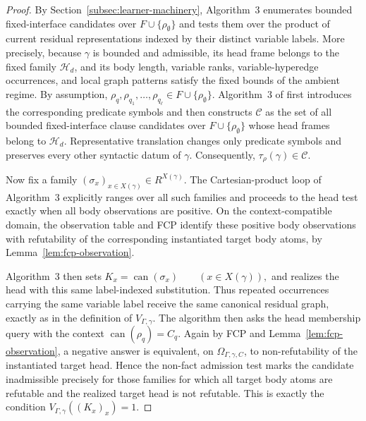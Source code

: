 \documentclass[11pt]{article}
\theoremstyle{definition}
\theoremstyle{remark}
\begin{document}
\begin{proof}
By Section~\ref{subsec:learner-machinery}, Algorithm~3 enumerates bounded
fixed-interface candidates over \(F\cup\{\rho_\emptyset\}\) and tests them
over the product of current residual representations indexed by their distinct
variable labels.  More precisely, because \(\gamma\) is bounded and
admissible, its head frame belongs to the fixed family \(\mathcal H_d\), and
its body length, variable ranks, variable-hyperedge occurrences, and local
graph patterns satisfy the fixed bounds of the ambient regime.  By assumption,
\(\rho_q,\rho_{q_1},\ldots,\rho_{q_\ell} \in F\cup\{\rho_\emptyset\}.\)
Algorithm~3 of \cite{ShoudaiEtAl2026} first introduces the corresponding
predicate symbols and then constructs \(\mathcal C\) as the set of all
bounded fixed-interface clause candidates over
\(F\cup\{\rho_\emptyset\}\) whose head frames belong to \(\mathcal H_d\).
Representative translation changes only predicate symbols and preserves every
other syntactic datum of \(\gamma\).  Consequently,
\(\tau_\rho(\gamma)\in\mathcal C.\)

Now fix a family
\((\sigma_x)_{x\in X(\gamma)}\in R^{X(\gamma)}.\)
The Cartesian-product loop of Algorithm~3 explicitly ranges over all such
families and proceeds to the head test exactly when all body observations are
positive.
On the context-compatible domain, the observation table and FCP identify these
positive body observations with refutability of the corresponding instantiated
target body atoms, by Lemma~\ref{lem:fcp-observation}.

Algorithm~3 then sets
\(K_x=\operatorname{can}(\sigma_x) \qquad(x\in X(\gamma)),\)
and realizes the head with this same label-indexed substitution.
Thus repeated occurrences carrying the same variable label receive the same
canonical residual graph, exactly as in the definition of
\(V_{\Gamma,\gamma}\).  The algorithm then asks the head membership
query with the context \(\operatorname{can}(\rho_q)=C_q\).  Again by FCP and
Lemma~\ref{lem:fcp-observation}, a negative answer is equivalent, on
\(\Omega_{\Gamma,\gamma,C}\), to non-refutability of the instantiated target
head.  Hence the non-fact admission test marks the candidate inadmissible
precisely for those families for which all target body atoms are refutable and
the realized target
head is not refutable.  This is exactly the condition
\(V_{\Gamma,\gamma}((K_x)_x)=1.\)
\end{proof}
\end{document}
